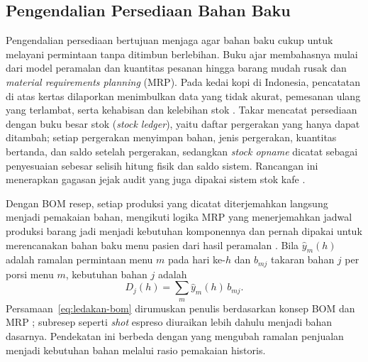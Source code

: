\subsection{Pengendalian Persediaan Bahan Baku}
\label{subsec:persediaan}

Pengendalian persediaan bertujuan menjaga agar bahan baku cukup untuk melayani permintaan tanpa ditimbun berlebihan. Buku ajar \citet*{silver2016inventory} membahasnya mulai dari model peramalan dan kuantitas pesanan hingga barang mudah rusak dan \textit{material requirements planning} (MRP). Pada kedai kopi di Indonesia, pencatatan di atas kertas dilaporkan menimbulkan data yang tidak akurat, pemesanan ulang yang terlambat, serta kehabisan dan kelebihan stok \citep*{taufiq2025implementation}. Takar mencatat persediaan dengan buku besar stok (\textit{stock ledger}), yaitu daftar pergerakan yang hanya dapat ditambah; setiap pergerakan menyimpan bahan, jenis pergerakan, kuantitas bertanda, dan saldo setelah pergerakan, sedangkan \textit{stock opname} dicatat sebagai penyesuaian sebesar selisih hitung fisik dan saldo sistem. Rancangan ini menerapkan gagasan jejak audit yang juga dipakai sistem stok kafe \citet*{abdur2026sistem}.

Dengan BOM resep, setiap produksi yang dicatat diterjemahkan langsung menjadi pemakaian bahan, mengikuti logika MRP yang menerjemahkan jadwal produksi barang jadi menjadi kebutuhan komponennya dan pernah dipakai untuk merencanakan bahan baku menu pasien dari hasil peramalan \citep*{sri2021raw}. Bila $\hat{y}_{m}(h)$ adalah ramalan permintaan menu $m$ pada hari ke-$h$ dan $b_{mj}$ takaran bahan $j$ per porsi menu $m$, kebutuhan bahan $j$ adalah
\begin{equation}
D_j(h) = \sum_{m} \hat{y}_{m}(h)\, b_{mj}.
\label{eq:ledakan-bom}
\end{equation}
Persamaan~\eqref{eq:ledakan-bom} dirumuskan penulis berdasarkan konsep BOM \citep{kamal2021bill} dan MRP \citep*{sri2021raw}; subresep seperti \textit{shot} espreso diuraikan lebih dahulu menjadi bahan dasarnya. Pendekatan ini berbeda dengan \citet*{piewthongngam2026aienabled} yang mengubah ramalan penjualan menjadi kebutuhan bahan melalui rasio pemakaian historis.

